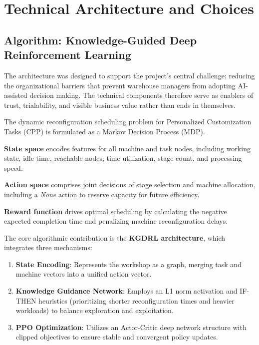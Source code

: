 
\section{Technical Architecture and Choices}\label{sec:architecture}

\subsection{Algorithm: Knowledge-Guided Deep Reinforcement Learning}

The architecture was designed to support the project's central challenge: reducing the organizational barriers that prevent warehouse managers from adopting AI-assisted decision making. The technical components therefore serve as enablers of trust, trialability, and visible business value rather than ends in themselves.

The dynamic reconfiguration scheduling problem for Personalized Customization Tasks (CPP) is formulated as a Markov Decision Process (MDP). 

\textbf{State space} encodes features for all machine and task nodes, including working state, idle time, reachable nodes, time utilization, stage count, and processing speed.

\textbf{Action space} comprises joint decisions of stage selection and machine allocation, including a \textit{None} action to reserve capacity for future efficiency.

\textbf{Reward function} drives optimal scheduling by calculating the negative expected completion time and penalizing machine reconfiguration delays.

The core algorithmic contribution is the \textbf{KGDRL architecture}, which integrates three mechanisms:

\begin{enumerate}
    \item \textbf{State Encoding}: Represents the workshop as a graph, merging task and machine vectors into a unified action vector.
    \item \textbf{Knowledge Guidance Network}: Employs an L1 norm activation and IF-THEN heuristics (prioritizing shorter reconfiguration times and heavier workloads) to balance exploration and exploitation.
    \item \textbf{PPO Optimization}: Utilizes an Actor-Critic deep network structure with clipped objectives to ensure stable and convergent policy updates.
\end{enumerate}

